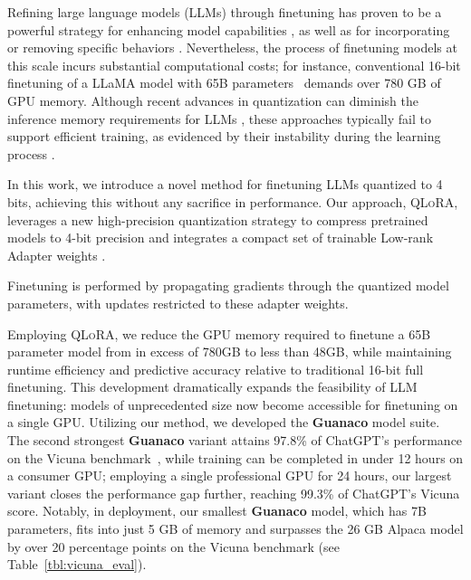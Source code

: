 Refining large language models (LLMs) through finetuning has proven to be a powerful strategy for enhancing model capabilities \citep{min2021metaicl, wei2021finetuned, ouyang2022training, wang2022super, wang2022self, liu2022few}, as well as for incorporating or removing specific behaviors \citep{ouyang2022training,askell2021general,bai2022training}. Nevertheless, the process of finetuning models at this scale incurs substantial computational costs; for instance, conventional 16-bit finetuning of a LLaMA model with 65B parameters~\citep{touvron2023llama} demands over 780 GB of GPU memory. Although recent advances in quantization can diminish the inference memory requirements for LLMs \citep{dettmers2022llm, dettmers2022case, frantar2022gptq, xiao2022smoothquant}, these approaches typically fail to support efficient training, as evidenced by their instability during the learning process \citep{wortsman2023stable}.

In this work, we introduce a novel method for finetuning LLMs quantized to 4 bits, achieving this without any sacrifice in performance. Our approach, \textsc{QLoRA}, leverages a new high-precision quantization strategy to compress pretrained models to 4-bit precision and integrates a compact set of trainable Low-rank Adapter weights \citep{hu2021lora}. 

Finetuning is performed by propagating gradients through the quantized model parameters, with updates restricted to these adapter weights.

Employing \textsc{QLoRA}, we reduce the GPU memory required to finetune a 65B parameter model from in excess of 780GB to less than 48GB, while maintaining runtime efficiency and predictive accuracy relative to traditional 16-bit full finetuning. This development dramatically expands the feasibility of LLM finetuning: models of unprecedented size now become accessible for finetuning on a single GPU. Utilizing our method, we developed the \textbf{Guanaco} model suite. The second strongest \textbf{Guanaco} variant attains 97.8\% of ChatGPT’s performance on the Vicuna benchmark~\citep{vicuna2023}, while training can be completed in under 12 hours on a consumer GPU; employing a single professional GPU for 24 hours, our largest variant closes the performance gap further, reaching 99.3\% of ChatGPT’s Vicuna score. Notably, in deployment, our smallest \textbf{Guanaco} model, which has 7B parameters, fits into just 5 GB of memory and surpasses the 26 GB Alpaca model by over 20 percentage points on the Vicuna benchmark (see Table~\ref{tbl:vicuna_eval}).

